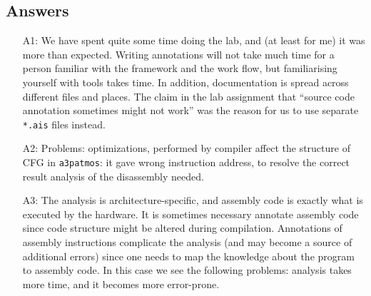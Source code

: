 \documentclass[12pt,a4paper,titlepage,oneside]{article}
\begin{document}
\subsection{Answers}
\begin{itemize}

\item[A1:]
  We have spent quite some time doing the lab, and (at least for me)
  it was more than expected. Writing annotations will not take much
  time for a person familiar with the framework and the work flow, but
  familiarising yourself with tools takes time. In addition,
  documentation is spread across different files and places. The claim
  in the lab assignment that ``source code annotation sometimes might not 
  work'' was the reason for us to use separate \texttt{*.ais} files
  instead. 

\item[A2:]
  Problems: optimizations, performed by compiler affect the structure
  of CFG in \texttt{a3patmos}: it gave wrong instruction address, to
  resolve the correct result analysis of the disassembly needed.

\item[A3:]
  The analysis is architecture-specific, and assembly code
  is exactly what is executed by the hardware. It is sometimes
  necessary annotate assembly code since code structure might be
  altered during compilation. Annotations of assembly instructions
  complicate the analysis (and may become a source of additional errors) 
  since one needs to map the knowledge about the program to assembly code.
  In this case we see the following problems: analysis takes more
  time, and it becomes more error-prone.

\end{itemize}
\end{document}

